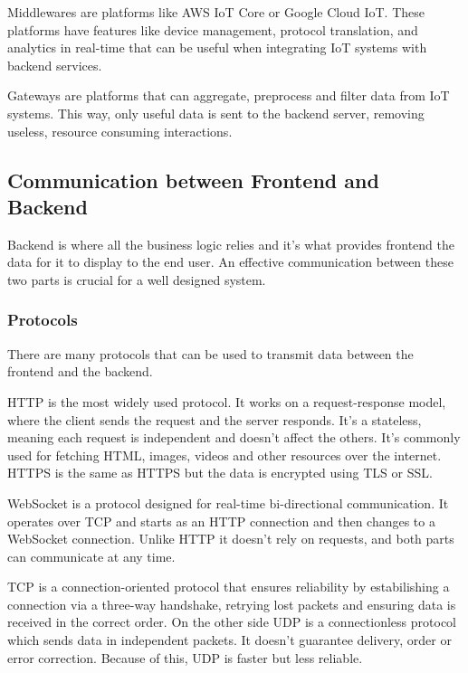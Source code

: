Middlewares are platforms like \gls{AWS} \gls{IoT} Core or Google Cloud \gls{IoT}.
These platforms have features like device management, protocol translation, and
analytics in real-time that can be useful when integrating \gls{IoT} systems
with backend services.

Gateways are platforms that can aggregate, preprocess and filter data
from \gls{IoT} systems. This way, only useful data is sent to the backend server,
removing useless, resource consuming interactions.

\subsection{Communication between Frontend and Backend}
Backend is where all the business logic relies and it's what provides frontend
the data for it to display to the end user. An effective communication between
these two parts is crucial for a well designed system.
\subsubsection{Protocols}
There are many protocols that can be used to transmit data between the frontend
and the backend.

\gls{HTTP} is the most widely used protocol. It works on a
request-response model, where the client sends the request and the server
responds. It's a stateless, meaning each request is independent and doesn't
affect the others. It's commonly used for fetching \gls{HTML}, images, videos
and other resources over the internet. \gls{HTTPS} is the same as \gls{HTTPS} but the
data is encrypted using \gls{TLS} or \gls{SSL}\cite{CloudflareHTTP, CloudflareHTTPS}.

WebSocket is a protocol designed for real-time bi-directional communication.
It operates over \gls{TCP} and starts as an \gls{HTTP} connection and then changes to a
WebSocket connection. Unlike \gls{HTTP} it doesn't rely on requests, and both
parts can communicate at any time\cite{WebsocketRFC}.

\gls{TCP} is a connection-oriented protocol that ensures reliability by
estabilishing a connection via a three-way handshake, retrying lost
packets and ensuring data is received in the correct order.
On the other side \gls{UDP} is a connectionless protocol which sends data in
independent packets. It doesn't guarantee delivery, order or error
correction. Because of this, \gls{UDP} is faster but less reliable\cite{al2018performance}.

